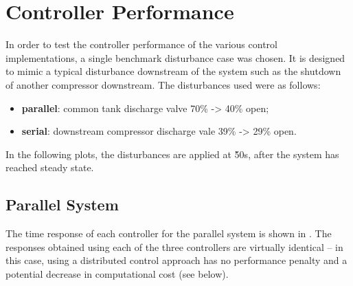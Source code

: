 \section{Controller Performance}
\label{sec:results:performance}

\newif\ifmakeplots
\makeplotsfalse


In order to test the controller performance of the various control implementations, a single benchmark disturbance case was chosen.
It is designed to mimic a typical disturbance downstream of the system such as the shutdown of another compressor downstream.
The disturbances used were as follows:

\begin{itemize}
  \item \textbf{parallel}: common tank discharge valve 70\% -> 40\% open;
  \item \textbf{serial}: downstream compressor discharge vale 39\% -> 29\% open.
\end{itemize}
In the following plots, the disturbances are applied at \u{50}{s}, after the system has reached steady state.


\subsection{Parallel System}
\label{sec:results:performance:parallel}

The time response of each controller for the parallel system is shown in .
The responses obtained using each of the three controllers are virtually identical -- in this case, using a distributed control approach has no performance penalty and a potential decrease in computational cost (see below). 


\ifmakeplots

